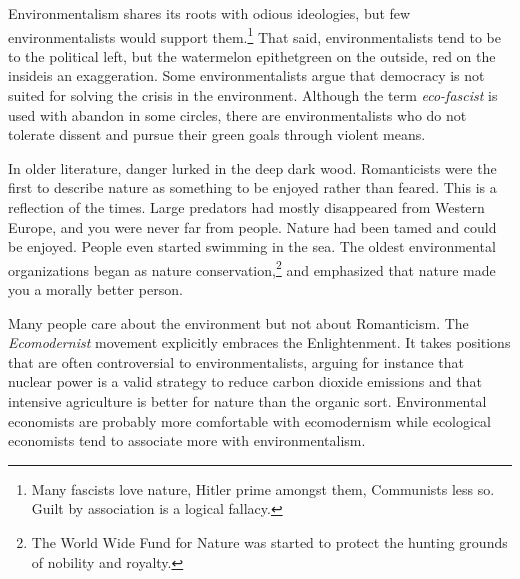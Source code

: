 Environmentalism shares its roots with odious ideologies, but few environmentalists would support them.\footnote{Many fascists love nature, Hitler prime amongst them, Communists less so. Guilt by association is a logical fallacy.} That said, environmentalists tend to be to the political left, but the watermelon epithet\textemdash green on the outside, red on the inside\textemdash is an exaggeration. Some environmentalists argue that democracy is not suited for solving the crisis in the environment. Although the term \emph{eco-fascist} is used with abandon in some circles, there are environmentalists who do not tolerate dissent and pursue their green goals through violent means.

In older literature, danger lurked in the deep dark wood. Romanticists were the first to describe nature as something to be enjoyed rather than feared. This is a reflection of the times. Large predators had mostly disappeared from Western Europe, and you were never far from people. Nature had been tamed and could be enjoyed. People even started swimming in the sea. The oldest environmental organizations began as nature conservation,\footnote{The World Wide Fund for Nature was started to protect the hunting grounds of nobility and royalty.} and emphasized that nature made you a morally better person.

Many people care about the environment but not about Romanticism. The \emph{Ecomodernist} movement explicitly embraces the Enlightenment. It takes positions that are often controversial to environmentalists, arguing for instance that nuclear power is a valid strategy to reduce carbon dioxide emissions and that intensive agriculture is better for nature than the organic sort. Environmental economists are probably more comfortable with ecomodernism while ecological economists tend to associate more with environmentalism.

